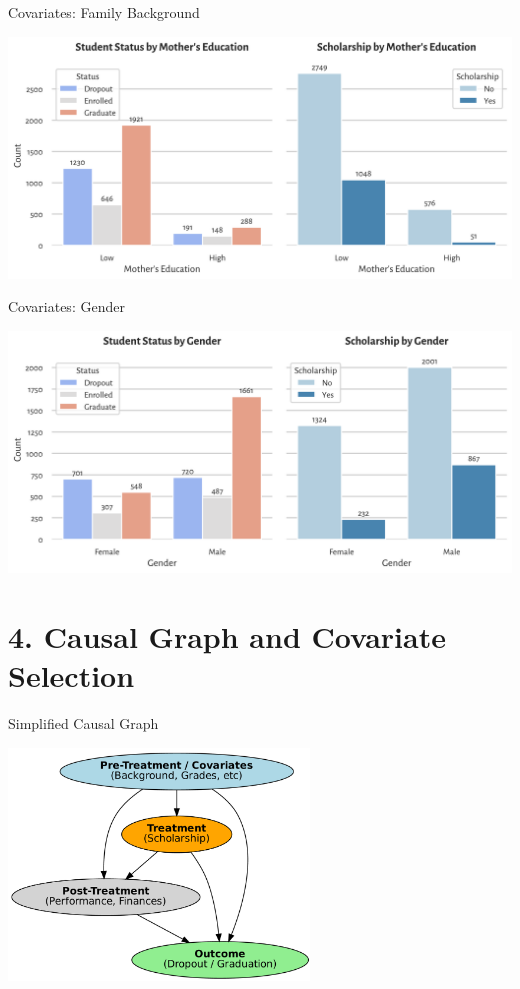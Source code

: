 \documentclass[aspectratio=169]{beamer}
\begin{document}
\begin{frame}{Covariates: Family Background}
	\begin{center}
     \includegraphics[width=1\textwidth]{Tex_Pictures/Graph_mother_educ}
     \end{center}
\end{frame}

\begin{frame}{Covariates: Gender}
	\begin{center}
     \includegraphics[width=1\textwidth]{Tex_Pictures/Graph_gender.png}
     \end{center}
\end{frame}


\section{4. Causal Graph and Covariate Selection}

\begin{frame}{Simplified Causal Graph}
	\begin{center}
     \includegraphics[width=0.6\textwidth]{Tex_Pictures/DAG_simple.png}
     \end{center}
\end{frame}
\end{document}
